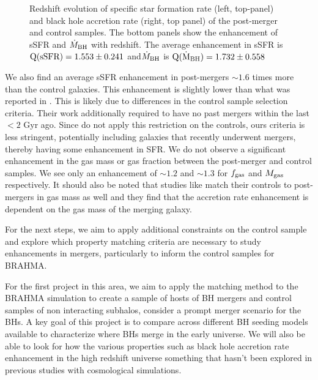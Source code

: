 \documentclass[11pt, letterpaper]{article}
\begin{document}
\begin{figure}[htp]
\begin{minipage}{0.45\textwidth}
        \label{fig:mdot_evolution}
    \end{minipage}
    \caption{Redshift evolution of specific star formation rate (left, top-panel) and black hole accretion rate (right, top panel) of the post-merger and control samples. The bottom panels show the enhancement of sSFR and $\dot{M}_{\rm BH}$ with redshift. The average enhancement in sSFR is $\rm Q(sSFR) = 1.553 \pm 0.241$ and$\dot{M}_{\rm BH}$ is $\rm Q(\dot{M}_{\rm BH}) = 1.732 \pm 0.558$   }
    \label{fig:sSFR-Mdot-redshift-evolution}
\end{figure}

We also find an average sSFR enhancement in post-mergers $\sim 1.6$ times more than the control galaxies. This enhancement is slightly lower than what was reported in \cite{Hani_2020}. This is likely due to differences in the control sample selection criteria. Their work additionally required to have no past mergers within the last $< 2$ Gyr ago. Since do not apply this restriction on the controls, ours criteria is less stringent, potentially including galaxies that recently underwent mergers, thereby having some enhancement in SFR. We do not observe a significant enhancement in the gas mass or gas fraction between the post-merger and control samples. We see only an enhancement of $\sim 1.2$ and $\sim  1.3$ for $f_{\rm gas}$ and $M_{\rm gas}$ respectively. It should also be noted that studies like \cite{Byrne_Mamahit_2022} match their controls to post-mergers in gas mass as well and they find that the accretion rate enhancement is dependent on the gas mass of the merging galaxy. 

For the next steps, we aim to apply additional constraints on the control sample and explore which property matching criteria are necessary to study enhancements in mergers, particularly to inform the control samples for BRAHMA. 

For the first project in this area, we aim to apply the matching method to the BRAHMA simulation to create a sample of hosts of BH mergers and control samples of non interacting subhalos, consider a prompt merger scenario for the BHs. A key goal of this project is to compare across different BH seeding models available to characterize where BHs merge in the early universe. We will also be able to look for how the various properties such as black hole accretion rate enhancement in the high redshift universe something that hasn't been explored in previous studies with cosmological simulations. 
\end{document}
